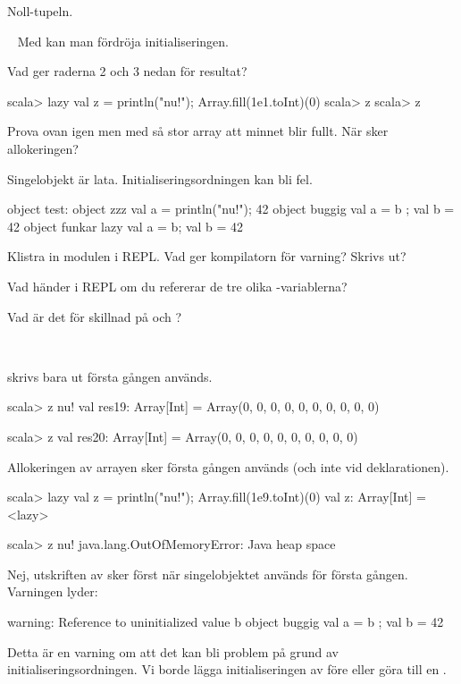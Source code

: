 \SubtaskSolved Noll-tupeln.

\QUESTEND



\QUESTBEGIN

\Task \what~ Med  kan man fördröja initialiseringen.

\Subtask Vad ger raderna 2 och 3 nedan för resultat?
\begin{REPL}
scala> lazy val z = { println("nu!"); Array.fill(1e1.toInt)(0)}
scala> z
scala> z
\end{REPL}

\Subtask Prova ovan igen men med så stor array att minnet blir fullt. När sker allokeringen?

\Subtask Singelobjekt är lata. Initialiseringsordningen kan bli fel.
\begin{Code}
object test:
  object zzz    { val a = { println("nu!"); 42} }
  object buggig { val a = b ; val b = 42        }
  object funkar { lazy val a = b; val b = 42    }
\end{Code}
\noindent Klistra in modulen  i REPL. Vad ger kompilatorn för varning? Skrivs   ut?

\Subtask Vad händer i REPL om du refererar de tre olika -variablerna?

\Subtask Vad är det för skillnad på  och ?

\SOLUTION

\TaskSolved \what~

\SubtaskSolved {} skrivs bara ut första gången  används.
\begin{REPL}
scala> z
nu!
val res19: Array[Int] = Array(0, 0, 0, 0, 0, 0, 0, 0, 0, 0)

scala> z
val res20: Array[Int] = Array(0, 0, 0, 0, 0, 0, 0, 0, 0, 0)
\end{REPL}

\SubtaskSolved Allokeringen av arrayen sker första gången  används (och inte vid deklarationen).
\begin{REPL}
scala> lazy val z = { println("nu!"); Array.fill(1e9.toInt)(0)}
val z: Array[Int] = <lazy>

scala> z
nu!
java.lang.OutOfMemoryError: Java heap space
\end{REPL}

\SubtaskSolved Nej, utskriften av  sker först när singelobjektet  används för första gången. Varningen lyder:
\begin{REPL}
warning: Reference to uninitialized value b
         object buggig { val a = b ; val b = 42}
\end{REPL}
\noindent Detta är en varning om att det kan bli problem på grund av initialiseringsordningen. Vi borde lägga initialiseringen av  före  eller göra  till en .

